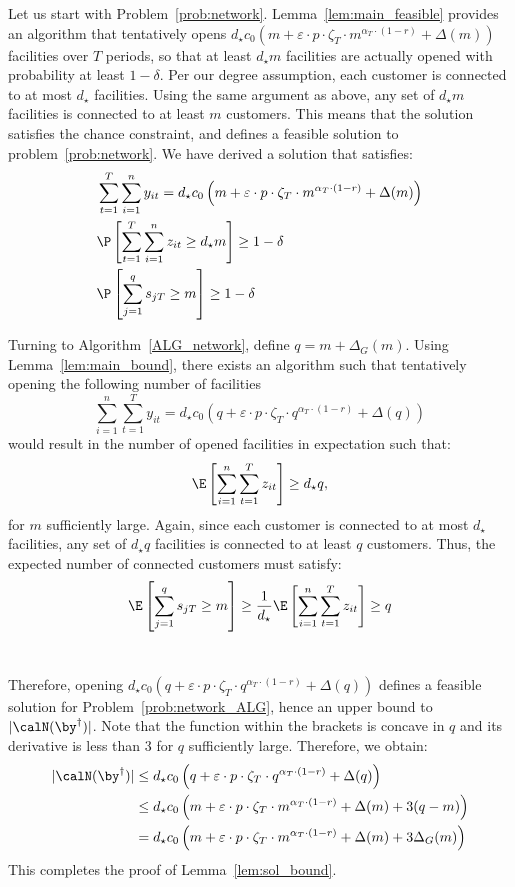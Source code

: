 \documentclass[blindrev]{informs3noheader}
\begin{document}
Let us start with Problem~\eqref{prob:network}. Lemma~\ref{lem:main_feasible} provides an algorithm that tentatively opens $d_\star c_0\left(m + \varepsilon\cdot p \cdot\zeta_T\cdot m^{\alpha_T\cdot(1-r)} + \Delta(m)\right)$ facilities over $T$ periods, so that at least $d_\star m$ facilities are actually opened with probability at least $1-\delta$. Per our degree assumption, each customer is connected to at most $d_\star$ facilities. Using the same argument as above, any set of $d_\star m$ facilities is connected to at least $m$ customers. This means that the solution satisfies the chance constraint, and defines a feasible solution to problem~\eqref{prob:network}. We have derived a solution that satisfies:
\begin{align*}
&\sum_{t=1}^T \sum_{i=1}^n y_{it} =d_\star c_0 \left(m + \varepsilon\cdot p \cdot\zeta_T\cdot m^{\alpha_T\cdot(1-r)}+ \Delta(m)\right) \\
& \P\left[\sum_{t=1}^T \sum_{i=1}^n z_{it} \geq d_\star m\right] \geq 1-\delta\\
& \P\left[\sum_{j=1}^q s_{jT} \geq m\right] \geq 1-\delta
\end{align*}

Turning to Algorithm~\ref{ALG_network}, define $q=m+\Delta_G(m)$. Using Lemma~\ref{lem:main_bound}, there exists an algorithm such that tentatively opening the following number of facilities
$$\sum_{i=1}^n \sum_{t=1}^T y_{it}=d_\star c_0 \left(q + \varepsilon\cdot p \cdot\zeta_T\cdot q^{\alpha_T\cdot(1-r)} + \Delta(q)\right)$$
would result in the number of opened facilities in expectation such that:
\[\E\left[\sum_{i=1}^n \sum_{t=1}^T z_{it}\right]  \geq d_\star q,\]
for $m$ sufficiently large. Again, since each customer is connected to at most $d_\star$ facilities, any set of $d_\star q$ facilities is connected to at least $q$ customers. Thus, the expected number of connected customers must satisfy:
\[\E\left[\sum_{j=1}^q s_{jT} \geq m\right]\geq\frac{1}{d_\star}\E\left[\sum_{i=1}^n \sum_{t=1}^T z_{it}\right]\geq q\]\

Therefore, opening $d_\star c_0 \left(q + \varepsilon\cdot p \cdot\zeta_T\cdot q^{\alpha_T\cdot(1-r)} + \Delta(q) \right)$ defines a feasible solution for Problem~\eqref{prob:network_ALG}, hence an upper bound to $|\calN(\by^\dagger)|$. Note that the function within the brackets is concave in $q$ and its derivative is less than 3 for $q$ sufficiently large. Therefore, we obtain:
\begin{align*}
|\calN(\by^\dagger)|&\leq d_\star c_0 \left(q + \varepsilon\cdot p \cdot \zeta_T\cdot q^{\alpha_T\cdot(1-r)} + \Delta(q)\right)\\
&\leq d_\star c_0 \left(m + \varepsilon\cdot p \cdot\zeta_T\cdot m^{\alpha_T\cdot(1-r)} + \Delta(m)+3(q-m)\right)\\
&= d_\star c_0 \left(m + \varepsilon\cdot p \cdot\zeta_T\cdot m^{\alpha_T\cdot(1-r)}+ \Delta(m)+3\Delta_G(m)\right)
\end{align*}
This completes the proof of Lemma~\ref{lem:sol_bound}.
\hfill\Halmos
\end{document}
